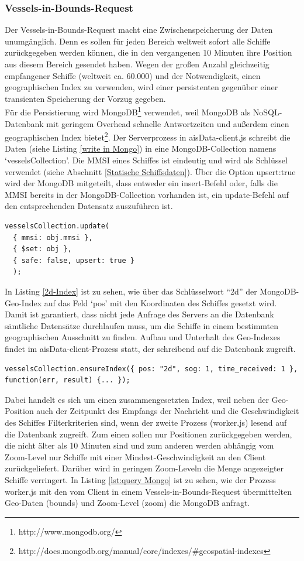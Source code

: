 \subsubsection{Vessels-in-Bounds-Request}\label{Vessels-in-Bounds-Request}
Der Vessels-in-Bounds-Request macht eine Zwischenspeicherung der Daten unumgänglich. Denn es sollen für jeden Bereich weltweit sofort alle Schiffe zurückgegeben werden können, die in den vergangenen 10 Minuten ihre Position aus diesem Bereich gesendet haben. Wegen der großen Anzahl gleichzeitig empfangener Schiffe (weltweit ca. 60.000) und der Notwendigkeit, einen geographischen Index zu verwenden, wird einer persistenten gegenüber einer transienten Speicherung der Vorzug gegeben. 
\\Für die Persistierung wird MongoDB\footnote{http://www.mongodb.org/} verwendet, weil MongoDB als NoSQL-Datenbank mit geringem Overhead schnelle Antwortzeiten und außerdem einen geographischen Index bietet\footnote{http://docs.mongodb.org/manual/core/indexes/\#geospatial-indexes}. Der Serverprozess in aisData-client.js schreibt die Daten (siehe Listing \ref{write in Mongo}) in eine MongoDB-Collection namens ‘vesselsCollection’. Die MMSI eines Schiffes ist eindeutig und wird als Schlüssel verwendet (siehe Abschnitt \ref{Statische Schiffsdaten}). Über die Option upsert:true wird der MongoDB mitgeteilt, dass entweder ein insert-Befehl oder, falls die MMSI bereits in der MongoDB-Collection vorhanden ist, ein update-Befehl auf den entsprechenden Datensatz auszuführen ist. 
\begin{lstlisting}[caption=Schreiben in die mongoDB in aisData-client.js, label=write in Mongo]
vesselsCollection.update(
  { mmsi: obj.mmsi },
  { $set: obj },
  { safe: false, upsert: true }
  );
\end{lstlisting}
In Listing \ref{2d-Index} ist zu sehen, wie über das Schlüsselwort “2d” der MongoDB-Geo-Index auf das Feld ‘pos’ mit den Koordinaten des Schiffes gesetzt wird. Damit ist garantiert, dass nicht jede Anfrage des Servers an die Datenbank sämtliche Datensätze durchlaufen muss, um die Schiffe in einem bestimmten geographischen Ausschnitt zu finden. Aufbau und Unterhalt des Geo-Indexes findet im aisData-client-Prozess statt, der schreibend auf die Datenbank zugreift.
\begin{lstlisting}[caption=Aufbau des Geo-Indexes in aisData-client.js, label= 2d-Index]
  vesselsCollection.ensureIndex({ pos: "2d", sog: 1, time_received: 1 }, function(err, result) {... });
  \end{lstlisting}
Dabei handelt es sich um einen zusammengesetzten Index, weil neben der Geo-Position auch der Zeitpunkt des Empfangs der Nachricht und die Geschwindigkeit des Schiffes Filterkriterien sind, wenn der zweite Prozess (worker.js) lesend auf die Datenbank zugreift. Zum einen sollen nur Positionen zurückgegeben werden, die nicht älter als 10 Minuten sind und zum anderen werden abhängig vom Zoom-Level nur Schiffe mit einer Mindest-Geschwindigkeit an den Client zurückgeliefert. Darüber wird in geringen Zoom-Leveln die Menge angezeigter Schiffe verringert. In Listing \ref{lst:query Mongo} ist zu sehen, wie der Prozess worker.js mit den vom Client in einem Vessels-in-Bounds-Request übermittelten Geo-Daten (bounds) und Zoom-Level (zoom) die MongoDB anfragt.
